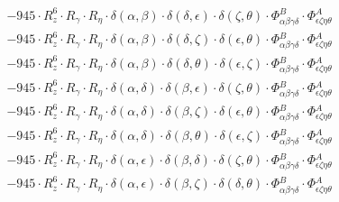 \documentclass{article}
\begin{document}
\begin{equation}
\begin{array}{c}
 \\[0.2em] 		 - 945 \cdot R_{z}^{6} \cdot R_{\gamma{}} \cdot R_{\eta{}} \cdot \delta{}\left(\alpha{}, \beta{}\right) \cdot \delta{}\left(\delta{}, \epsilon{}\right) \cdot \delta{}\left(\zeta{}, \theta{}\right) \cdot \Phi{}^{B}_{\alpha{}\beta{}\gamma{}\delta{}} \cdot \Phi{}^{A}_{\epsilon{}\zeta{}\eta{}\theta{}} 
 \\[0.2em] 		 - 945 \cdot R_{z}^{6} \cdot R_{\gamma{}} \cdot R_{\eta{}} \cdot \delta{}\left(\alpha{}, \beta{}\right) \cdot \delta{}\left(\delta{}, \zeta{}\right) \cdot \delta{}\left(\epsilon{}, \theta{}\right) \cdot \Phi{}^{B}_{\alpha{}\beta{}\gamma{}\delta{}} \cdot \Phi{}^{A}_{\epsilon{}\zeta{}\eta{}\theta{}} 
 \\[0.2em] 		 - 945 \cdot R_{z}^{6} \cdot R_{\gamma{}} \cdot R_{\eta{}} \cdot \delta{}\left(\alpha{}, \beta{}\right) \cdot \delta{}\left(\delta{}, \theta{}\right) \cdot \delta{}\left(\epsilon{}, \zeta{}\right) \cdot \Phi{}^{B}_{\alpha{}\beta{}\gamma{}\delta{}} \cdot \Phi{}^{A}_{\epsilon{}\zeta{}\eta{}\theta{}} 
 \\[0.2em] 		 - 945 \cdot R_{z}^{6} \cdot R_{\gamma{}} \cdot R_{\eta{}} \cdot \delta{}\left(\alpha{}, \delta{}\right) \cdot \delta{}\left(\beta{}, \epsilon{}\right) \cdot \delta{}\left(\zeta{}, \theta{}\right) \cdot \Phi{}^{B}_{\alpha{}\beta{}\gamma{}\delta{}} \cdot \Phi{}^{A}_{\epsilon{}\zeta{}\eta{}\theta{}} 
 \\[0.2em] 		 - 945 \cdot R_{z}^{6} \cdot R_{\gamma{}} \cdot R_{\eta{}} \cdot \delta{}\left(\alpha{}, \delta{}\right) \cdot \delta{}\left(\beta{}, \zeta{}\right) \cdot \delta{}\left(\epsilon{}, \theta{}\right) \cdot \Phi{}^{B}_{\alpha{}\beta{}\gamma{}\delta{}} \cdot \Phi{}^{A}_{\epsilon{}\zeta{}\eta{}\theta{}} 
 \\[0.2em] 		 - 945 \cdot R_{z}^{6} \cdot R_{\gamma{}} \cdot R_{\eta{}} \cdot \delta{}\left(\alpha{}, \delta{}\right) \cdot \delta{}\left(\beta{}, \theta{}\right) \cdot \delta{}\left(\epsilon{}, \zeta{}\right) \cdot \Phi{}^{B}_{\alpha{}\beta{}\gamma{}\delta{}} \cdot \Phi{}^{A}_{\epsilon{}\zeta{}\eta{}\theta{}} 
 \\[0.2em] 		 - 945 \cdot R_{z}^{6} \cdot R_{\gamma{}} \cdot R_{\eta{}} \cdot \delta{}\left(\alpha{}, \epsilon{}\right) \cdot \delta{}\left(\beta{}, \delta{}\right) \cdot \delta{}\left(\zeta{}, \theta{}\right) \cdot \Phi{}^{B}_{\alpha{}\beta{}\gamma{}\delta{}} \cdot \Phi{}^{A}_{\epsilon{}\zeta{}\eta{}\theta{}} 
 \\[0.2em] 		 - 945 \cdot R_{z}^{6} \cdot R_{\gamma{}} \cdot R_{\eta{}} \cdot \delta{}\left(\alpha{}, \epsilon{}\right) \cdot \delta{}\left(\beta{}, \zeta{}\right) \cdot \delta{}\left(\delta{}, \theta{}\right) \cdot \Phi{}^{B}_{\alpha{}\beta{}\gamma{}\delta{}} \cdot \Phi{}^{A}_{\epsilon{}\zeta{}\eta{}\theta{}} 

\end{array}
\end{equation}
\end{document}
